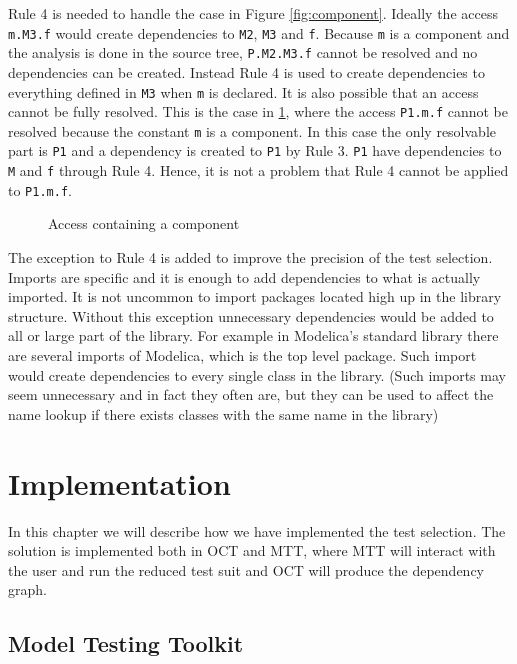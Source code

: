 \documentclass{cslthse-msc}
\begin{document}
Rule 4 is needed to handle the case in Figure \ref{fig:component}. Ideally the access \texttt{m.M3.f} would create dependencies to \texttt{M2}, \texttt{M3} and \texttt{f}. Because \texttt{m} is a component and the analysis is done in the source tree, \texttt{P.M2.M3.f} cannot be resolved and no dependencies can be created. Instead Rule 4 is used to create dependencies to everything defined in \texttt{M3} when \texttt{m} is declared.
It is also possible that an access cannot be fully resolved. This is the case in \ref{fig:brokenAccess}, where the access \texttt{P1.m.f} cannot be resolved because the constant \texttt{m} is a component. In this case the only resolvable part is \texttt{P1} and a  dependency is created to \texttt{P1} by Rule 3. \texttt{P1} have dependencies to \texttt{M} and \texttt{f} through Rule 4. Hence, it is not a problem that Rule 4 cannot be applied to \texttt{P1.m.f}.

\begin{figure}[!htbp]
    \centering
    \qquad
    \subfloat{\raisebox{4.0 cm}{}}
    \caption{Access containing a component}
    \label{fig:brokenAccess}
\end{figure}

The exception to Rule 4 is added to improve the precision of the test selection. Imports are specific and it is enough to add dependencies to what is actually imported. It is not uncommon to import packages located high up in the library structure. Without this exception unnecessary dependencies would be added to all or large part of the library. For example in Modelica's standard library there are several imports of Modelica, which is the top level package. Such import would create dependencies to every single class in the library. (Such imports may seem unnecessary and in fact they often are, but they can be used to affect the name lookup if there exists classes with the same name in the library)  

\chapter[Implementation]{Implementation}
In this chapter we will describe how we have implemented the test selection. The solution is implemented both in OCT and MTT, where MTT will interact with the user and run the reduced test suit and OCT will produce the dependency graph.


\section{Model Testing Toolkit}
\end{document}
